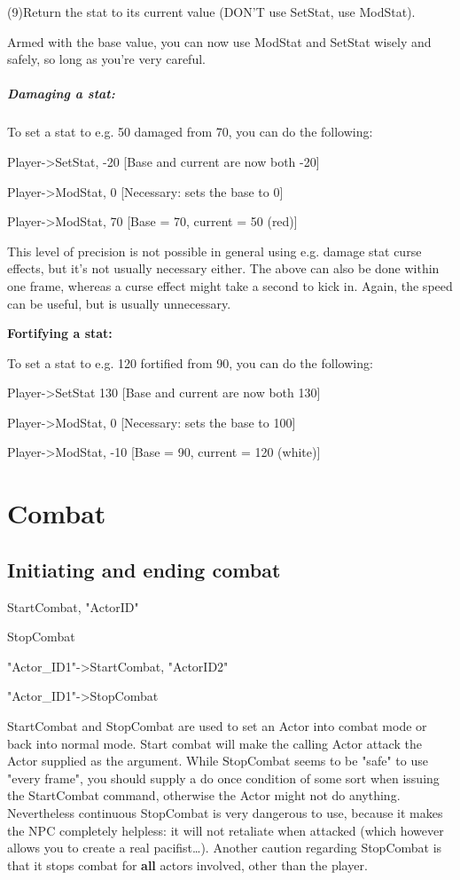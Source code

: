 (9)Return the stat to its current value (DON'T use SetStat, use
ModStat).

Armed with the base value, you can now use ModStat and SetStat wisely
and safely, so long as you're very careful.

\hypertarget{damaging-a-stat}{%
\subparagraph{Damaging a stat:}\label{damaging-a-stat}}

To set a stat to e.g. 50 damaged from 70, you can do the following:

Player-\textgreater SetStat, -20 {[}Base and current are now both -20{]}

Player-\textgreater ModStat, 0 {[}Necessary: sets the base to 0{]}

Player-\textgreater ModStat, 70 {[}Base = 70, current = 50 (red){]}

This level of precision is not possible in general using e.g. damage
stat curse effects, but it's not usually necessary either. The above can
also be done within one frame, whereas a curse effect might take a
second to kick in. Again, the speed can be useful, but is usually
unnecessary.

\textbf{Fortifying a stat:}

To set a stat to e.g. 120 fortified from 90, you can do the following:

Player-\textgreater SetStat 130 {[}Base and current are now both 130{]}

Player-\textgreater ModStat, 0 {[}Necessary: sets the base to 100{]}

Player-\textgreater ModStat, -10 {[}Base = 90, current = 120 (white){]}

\hypertarget{combat}{%
\section{Combat}\label{combat}}

\hypertarget{initiating-and-ending-combat}{%
\subsection{Initiating and ending
combat}\label{initiating-and-ending-combat}}

StartCombat, "ActorID"

StopCombat

"Actor\_ID1"-\textgreater StartCombat, "ActorID2"

"Actor\_ID1"-\textgreater StopCombat

StartCombat and StopCombat are used to set an Actor into combat mode or
back into normal mode. Start combat will make the calling Actor attack
the Actor supplied as the argument. While StopCombat seems to be "safe"
to use "every frame", you should supply a do once condition of some sort
when issuing the StartCombat command, otherwise the Actor might not do
anything. Nevertheless continuous StopCombat is very dangerous to use,
because it makes the NPC completely helpless: it will not retaliate when
attacked (which however allows you to create a real pacifist\ldots).
Another caution regarding StopCombat is that it stops combat for
\textbf{all} actors involved, other than the player.

